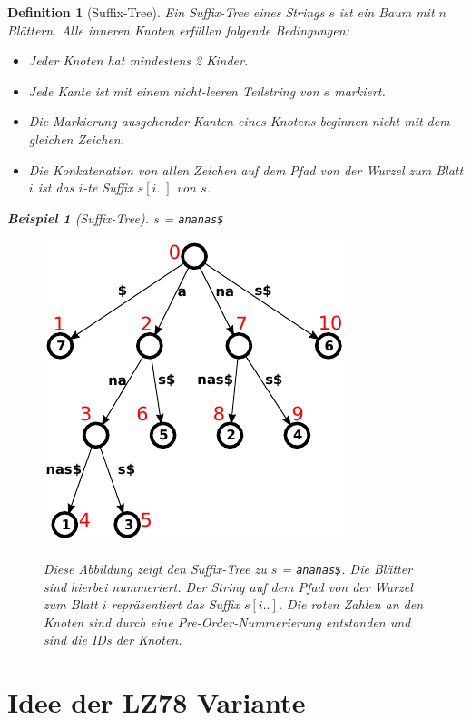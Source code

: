 \documentclass[a4paper,11pt]{scrartcl}%
\theoremstyle{change}
\theoremstyle{nonumberplain}
\theoremstyle{change}
\newtheorem{definition}[theorem]{Definition}
\theoremstyle{nonumberplain}
\theoremstyle{change}
\newtheorem{beispiel}[theorem]{Beispiel}
\theoremstyle{nonumberplain}
\begin{document}
\begin{definition}[Suffix-Tree]
		Ein Suffix-Tree eines Strings $s$ ist ein Baum mit $n$ Blättern. Alle inneren Knoten erfüllen folgende Bedingungen:
		\begin{itemize}
			\item Jeder Knoten hat mindestens 2 Kinder.
			\item Jede Kante ist mit einem nicht-leeren Teilstring von $s$ markiert.
			\item Die Markierung ausgehender Kanten eines Knotens beginnen nicht mit dem gleichen Zeichen.
			\item Die Konkatenation von allen Zeichen auf dem Pfad von der Wurzel zum Blatt $i$ ist das $i$-te Suffix $s[i..]$ von $s$.
		\end{itemize}
		\begin{beispiel}[Suffix-Tree]
			$s$ = \texttt{ananas\$}
			\begin{figure}[h]
				\centering
				  \includegraphics[scale=0.8]{./pics/ananas_suffixTree_inorder}
				  \cite{suffixtreeurl}
				  \caption{Diese Abbildung zeigt den Suffix-Tree zu $s$ = \texttt{ananas\$}. Die Blätter sind hierbei nummeriert. Der String auf dem Pfad von der Wurzel zum Blatt $i$ repräsentiert das Suffix $s[i..]$. Die roten Zahlen an den Knoten sind durch eine Pre-Order-Nummerierung entstanden und sind die IDs der Knoten. }
				  \label{fig:suffixTree}
			\end{figure}
		\end{beispiel}
		
	\end{definition}
	
	
\section{Idee der LZ78 Variante}
\end{document}
